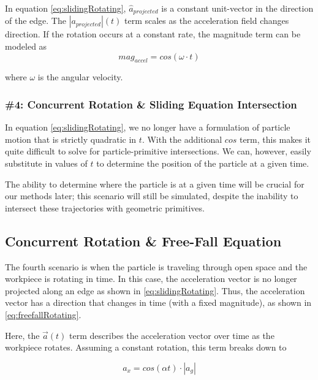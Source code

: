  {
	\label{eq:slidingRotating}
}

In equation \eqref{eq:slidingRotating}, $\hat{a}_{projected}$ is a constant unit-vector in the direction of the edge. The $|a_{projected}|(t)$ term scales as the acceleration field changes direction. If the rotation occurs at a constant rate, the magnitude term can be modeled as
$$
mag_{accel} = cos(\omega \cdot t)
$$

where $\omega$ is the angular velocity.

		\subsubsection{\#4: Concurrent Rotation \& Sliding Equation Intersection}

In equation \eqref{eq:slidingRotating}, we no longer have a formulation of particle motion that is strictly quadratic in $t$. With the additional $cos$ term, this makes it quite difficult to solve for particle-primitive intersections. We can, however, easily substitute in values of $t$ to determine the position of the particle at a given time.

The ability to determine where the particle is at a given time will be crucial for our methods later; this scenario will still be simulated, despite the inability to intersect these trajectories with geometric primitives.

		\subsection{Concurrent Rotation \& Free-Fall Equation}

The fourth scenario is when the particle is traveling through open space and the workpiece is rotating in time. In this case, the acceleration vector is no longer projected along an edge as shown in \eqref{eq:slidingRotating}. Thus, the acceleration vector has a direction that changes in time (with a fixed magnitude), as shown in \eqref{eq:freefallRotating}.

 {
	\label{eq:freefallRotating}
}

Here, the $\vec{a}(t)$ term describes the acceleration vector over time as the workpiece rotates. Assuming a constant rotation, this term breaks down to

$$
a_x = cos(\alpha t) \cdot |a_g|
$$

